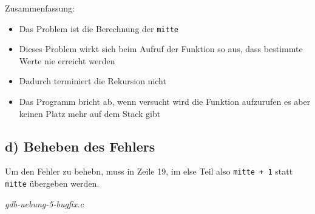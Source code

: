 \documentclass[12pt]{article}
\begin{document}
Zusammenfassung:

\begin{itemize}
\item Das Problem ist die Berechnung der \texttt{mitte}
\item Dieses Problem wirkt sich beim Aufruf der Funktion so aus, dass bestimmte Werte nie erreicht werden
\item Dadurch terminiert die Rekursion nicht
\item Das Programm bricht ab, wenn versucht wird die Funktion aufzurufen es aber keinen Platz mehr auf dem Stack gibt
\end{itemize}



\subsection{d) Beheben des Fehlers}

Um den Fehler zu behebn, muss in Zeile 19, im else Teil also \texttt{mitte + 1} statt \texttt{mitte} übergeben werden.

\textit{gdb-uebung-5-bugfix.c}

\end{document}
